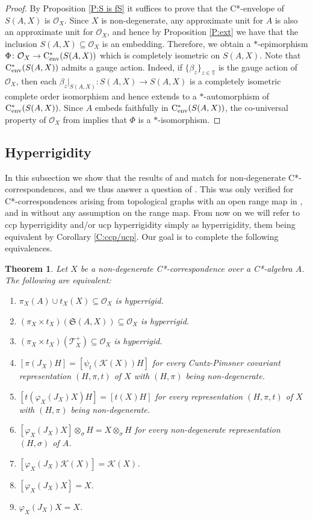 \documentclass[11pt, draft]{amsart}
\numberwithin{equation}{section}
\theoremstyle{plain}
\newtheorem{theorem}{Theorem}[section]
\theoremstyle{definition}
\theoremstyle{remark}
\newcommand{\K}{{\mathcal{K}}}
\renewcommand{\O}{{\mathcal{O}}}
\newcommand{\T}{{\mathcal{T}}}
\def\be{\beta}
\def\si{\sigma}
\newcommand\vphi{\varphi}
\newcommand{\bT}{\mathbb{T}}
\newcommand{\fS}{{\mathfrak{S}}}
\newcommand{\cenv}{\mathrm{C}^*_{\textup{env}}}
\begin{document}
\begin{proof}
By Proposition \ref{P:S is fS} it suffices to prove that the C*-envelope of $S(A,X)$ is $\O_X$. 
Since $X$ is non-degenerate, any approximate unit for $A$ is also an approximate unit for $\O_X$, and hence by Proposition \ref{P:ext} we have that the inclusion $S(A,X)\subseteq \O_X$ is an embedding. 
Therefore, we obtain a $*$-epimorphism $\Phi\colon \O_X\to \cenv(S(A,X))$ which is completely isometric on $S(A,X)$. 
Note that $\cenv(S(A,X))$ admits a gauge action. Indeed, if $\{\be_z\}_{z \in \bT}$ is the gauge action of $\O_X$, then each $\be_z|_{S(A,X)}\colon S(A,X)\to S(A,X)$ is a completely isometric complete order isomorphism and hence extends to a $*$-automorphism of $\cenv(S(A,X))$.
Since $A$ embeds faithfully in $\cenv(S(A,X))$, the co-universal property of $\O_X$ from \cite[Proposition 7.14]{Kat07} implies that $\Phi$ is a $*$-isomorphism.
\end{proof}

\subsection{Hyperrigidity}

In this subsection we show that the results of \cite{KR20, KR21} and \cite{Kim21} match for non-degenerate C*-correspondences, and we thus answer a question of \cite{KR20}.
This was only verified for C*-correspondences arising from topological graphs with an open range map in \cite{Kim21}, and in \cite{KR20} without any assumption on the range map. 
From now on we will refer to ccp hyperrigidity and/or ucp hyperrigidity simply as hyperrigidity, them being equivalent by Corollary \ref{C:ccp/ucp}.
Our goal is to complete the following equivalences.

\begin{theorem}\label{T:hyp}
Let $X$ be a non-degenerate C*-correspondence over a C*-algebra $A$.
The following are equivalent:
\begin{enumerate}
\item $\pi_X(A) \cup t_X(X)\subseteq \O_X$ is hyperrigid.
\item $(\pi_X \times t_X)(\fS(A,X)) \subseteq \O_X$ is hyperrigid.
\item $(\pi_X \times t_X)(\T_X^+) \subseteq \O_X$ is hyperrigid.
\item $[\pi(J_X)H] = [\psi_t(\K(X))H]$ for every Cuntz-Pimsner covariant representation $(H,\pi,t)$ of $X$ with $(H,\pi)$ being non-degenerate.
\item $[t(\vphi_X(J_X)X)H] = [t(X)H]$ for every representation $(H,\pi,t)$ of $X$ with $(H,\pi)$ being non-degenerate.
\item $[\vphi_X(J_X)X] \otimes_\si H = X \otimes_\si H$ for every non-degenerate representation $(H,\si)$ of $A$.
\item $[\vphi_X(J_X) \K(X)]  =\K(X)$.
\item $[\vphi_X(J_X) X] = X$.
\item $\vphi_X(J_X) X = X$.
\end{enumerate}
\end{theorem}
\end{document}
